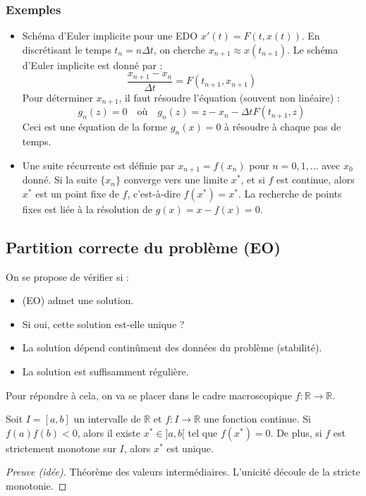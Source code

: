 \documentclass{article}
\begin{document}
\subsubsection{Exemples} %
\begin{itemize}
    \item Schéma d'Euler implicite pour une EDO $x'(t) = F(t, x(t))$. En discrétisant le temps $t_n = n \Delta t$, on cherche $x_{n+1} \approx x(t_{n+1})$. Le schéma d'Euler implicite est donné par :
    \[ \frac{x_{n+1} - x_n}{\Delta t} = F(t_{n+1}, x_{n+1}) \]
    Pour déterminer $x_{n+1}$, il faut résoudre l'équation (souvent non linéaire) :
    \[ g_n(z) = 0 \quad \text{où} \quad g_n(z) = z - x_n - \Delta t F(t_{n+1}, z) \]
    Ceci est une équation de la forme $g_n(x) = 0$ à résoudre à chaque pas de temps.
    \item Une suite récurrente est définie par $x_{n+1} = f(x_n)$ pour $n=0, 1, ...$ avec $x_0$ donné. Si la suite $\{x_n\}$ converge vers une limite $x^*$, et si $f$ est continue, alors $x^*$ est un point fixe de $f$, c'est-à-dire $f(x^*) = x^*$. La recherche de points fixes est liée à la résolution de $g(x) = x - f(x) = 0$.
\end{itemize}

\subsection{Partition correcte du problème (EO)} %
On se propose de vérifier si :
\begin{itemize}
    \item (EO) admet une solution.
    \item Si oui, cette solution est-elle unique ?
    \item La solution dépend continûment des données du problème (stabilité).
    \item La solution est suffisamment régulière.
\end{itemize}
Pour répondre à cela, on va se placer dans le cadre macroscopique $f: \mathbb{R} \to \mathbb{R}$.

\begin{proposition}[Existence - Cas $f(x)=0$]
Soit $I = [a, b]$ un intervalle de $\mathbb{R}$ et $f: I \to \mathbb{R}$ une fonction continue. Si $f(a)f(b) < 0$, alors il existe $x^* \in ]a, b[$ tel que $f(x^*)=0$.
De plus, si $f$ est strictement monotone sur $I$, alors $x^*$ est unique.
\begin{proof}[Preuve (idée)]
Théorème des valeurs intermédiaires. L'unicité découle de la stricte monotonie.
\end{proof}
\end{proposition}
\end{document}
